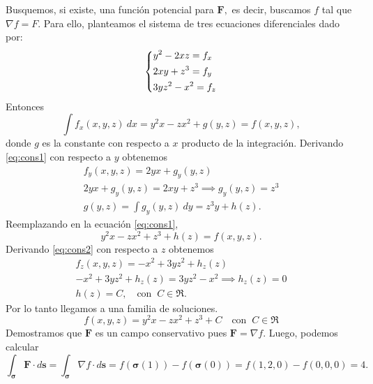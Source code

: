 \begin{solution}
Busquemos, si existe,  una funci\'on potencial para $\mathbf{F},$ es decir, buscamos $f$ tal que $\nabla f = F.$ Para ello,  planteamos el sistema de tres ecuaciones diferenciales dado por:
\[\begin{dcases}
        y^2-2xz=f_x \\
        2xy+z^3=f_y \\
        3yz^2-x^2=f_z
    \end{dcases}\]
Entonces
\begin{equation}
    \int f_x(x,y,z)\:dx=y^2x-zx^2+g(y,z)=f(x,y,z), \label{eq:cons1}
\end{equation}
donde $g$ es la constante con respecto a $x$ producto de la integraci\'on. Derivando \eqref{eq:cons1} con respecto a $y$ obtenemos
\begin{gather*}
    f_y(x,y,z)= 2yx+g_y(y,z)\\[.2cm]
    2yx+g_y(y,z)  = 2xy+z^3 \implies g_y(y,z)=z^3\\[.2cm]
    g(y,z)=\int  g_y(y,z) \:dy =  z^3y+h(z).
\end{gather*}
Reemplazando en  la ecuaci\'on \eqref{eq:cons1},
\begin{equation}
y^2x-zx^2+z^3+h(z) =  f(x,y,z).   \label{eq:cons2}
\end{equation}
Derivando \eqref{eq:cons2} con respecto a $z$ obtenemos
\begin{gather*}
    f_z(x,y,z)=-x^2+3yz^2+h_z(z)\\
    -x^2+3yz^2+h_z(z)=3yz^2-x^2   \implies h_z(z) =0 \\[.2cm]
    h(z) = C,\quad\text{con}\;\;C\in\Re.
\end{gather*}
Por lo tanto llegamos a una familia de soluciones.
\[
    f(x,y,z)=y^2x-zx^2+z^3+C  \quad\text{con}\;\;C\in\Re
\]
Demostramos que $\mathbf{F}$ es un campo conservativo pues $\mathbf{F}=\nabla f.$ Luego, podemos calcular
\[
    \int _{\boldsymbol{\sigma}} \mathbf{F}\cdot d\mathbf{s}=
    \int _{\boldsymbol{\sigma}} \nabla f\cdot d\mathbf{s} = f(\boldsymbol{\sigma}(1))-f(\boldsymbol{\sigma}(0))=f(1,2,0)-f(0,0,0)=4.
\]
\end{solution}


